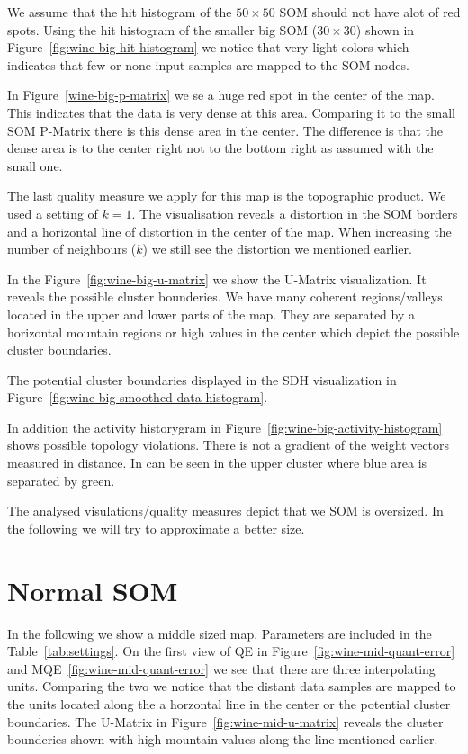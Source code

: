 \documentclass{acm_proc_article-sp}
\begin{document}
We assume that the hit histogram of the $50\times50$ SOM should not have alot of red spots.
Using the hit histogram of the smaller big SOM ($30\times30$) shown in Figure~\ref{fig:wine-big-hit-histogram} we notice that very light
colors which indicates that few or none input samples are mapped to the SOM nodes.

In Figure~\ref{wine-big-p-matrix} we se a huge red spot in the center of the map. This indicates that
the data is very dense at this area. Comparing it to the small SOM P-Matrix there is this dense area
in the center. The difference is that the dense area is to the center right not to the bottom right as assumed with
the small one.

The last quality measure we apply for this map is the topographic product.
We used a setting of $k=1$. The visualisation reveals a distortion in the
SOM borders and a horizontal line of distortion in the center of the map.
When increasing the number of neighbours ($k$) we still see the distortion
we mentioned earlier.

In the Figure~\ref{fig:wine-big-u-matrix} we show the U-Matrix visualization.
It reveals the possible cluster bounderies. We have many coherent regions/valleys located in
the upper and lower parts of the map. They are separated by a horizontal mountain regions
or high values in the center which depict the possible cluster boundaries.

The potential cluster boundaries displayed in the SDH visualization in Figure~\ref{fig:wine-big-smoothed-data-histogram}.

In addition the activity historygram in Figure~\ref{fig:wine-big-activity-histogram} shows possible
topology violations. There is not a gradient of the weight vectors measured in distance. In can
be seen in the upper cluster where blue area is separated by green.

The analysed visulations/quality measures depict that we SOM is oversized.
In the following we will try to approximate a better size.

\section{Normal SOM}

In the following we show a middle sized map. Parameters are included in the Table~\ref{tab:settings}.
On the first view of QE in Figure~\ref{fig:wine-mid-quant-error} and MQE~\ref{fig:wine-mid-quant-error} we see
that there are three interpolating units. Comparing the two we notice that the distant data samples are
mapped to the units located along the a horzontal line in the center or the potential cluster boundaries.
The U-Matrix in Figure~\ref{fig:wine-mid-u-matrix} reveals the cluster bounderies shown with high mountain values
along the line mentioned earlier.
\end{document}
